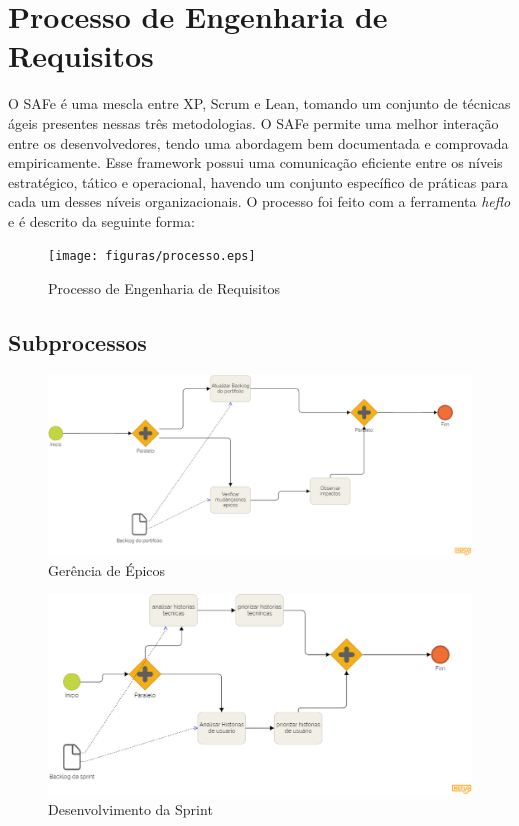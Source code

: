 \chapter[Processo de Engenharia de Requisitos]{Processo de Engenharia de Requisitos}
O SAFe é uma mescla entre XP, Scrum e Lean, tomando um conjunto de técnicas ágeis presentes nessas
três metodologias. O SAFe permite uma melhor interação entre os desenvolvedores, tendo uma abordagem bem documentada e
comprovada empiricamente. Esse framework possui uma comunicação eficiente entre os níveis estratégico, tático e operacional,
havendo um conjunto específico de práticas para cada um desses níveis organizacionais. O processo foi feito com a ferramenta
\textit{heflo} e é descrito da seguinte forma:

\begin{figure}[h]
	\centering
	\texttt{[image: figuras/processo.eps]}
	\caption{Processo de Engenharia de Requisitos}
	\label{fig03}
\end{figure}

\section{Subprocessos}
\begin{figure}[h]
	\centering
	\includegraphics[keepaspectratio=true,scale=0.4]{figuras/subprocessoportfolio.eps}
	\caption{Gerência de Épicos}
	\label{fig04}
\end{figure}

\begin{figure}[h]
	\centering
	\includegraphics[keepaspectratio=true,scale=0.4]{figuras/gerencia.eps}
	\caption{Desenvolvimento da Sprint}
	\label{fig05}
\end{figure}

